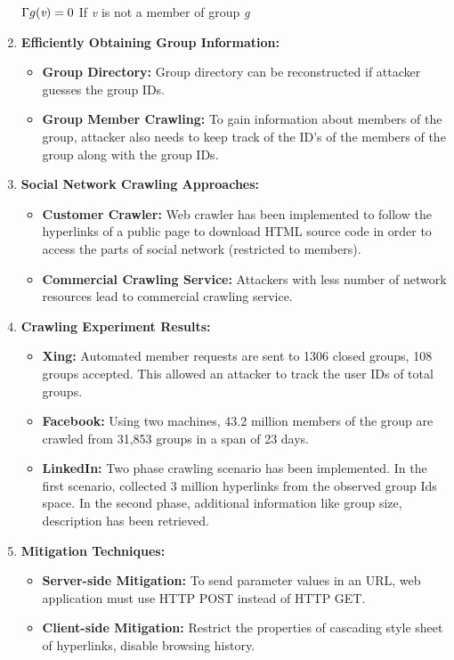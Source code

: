 \documentclass{article}
\begin{document}
\begin{enumerate}
$\Gamma g(\emph{v})=0$
If \emph{v} is not a member of group \emph{g}


\item\textbf{Efficiently Obtaining Group Information:}
\begin{itemize}
	\item \textbf{Group Directory:} Group directory can be reconstructed if attacker guesses the group IDs.
	\item \textbf{Group Member Crawling:} To gain information about members of the group, attacker also needs to keep track of the ID’s of the members of the group along with the group IDs.
\end{itemize}


\item\textbf{Social Network Crawling Approaches:}
\begin{itemize}
	\item \textbf{Customer Crawler:} Web crawler has been implemented to follow the hyperlinks of a public page to download HTML source code in order to access the parts of social network (restricted to members).
	\item \textbf{Commercial Crawling Service:} Attackers with less number of network resources lead to commercial crawling service.
\end{itemize}

\item\textbf{Crawling Experiment Results:}
\begin{itemize}
	\item \textbf{Xing:} Automated member requests are sent to 1306 closed groups, 108 groups accepted. This allowed an attacker to track the user IDs of total groups.	
	\item \textbf{Facebook:} Using two machines, 43.2 million members of the group are crawled from 31,853 groups in a span of 23 days.
	\item \textbf{LinkedIn:} Two phase crawling scenario has been implemented. In the first scenario, collected 3 million hyperlinks from the observed group Ids space. In the second phase, additional information like group size, description has been retrieved.
\end{itemize}


\item\textbf{Mitigation Techniques:}
\begin{itemize}
	\item \textbf{Server-side Mitigation:} To send parameter values in an URL, web application must use HTTP POST instead of HTTP GET.
	\item \textbf{Client-side Mitigation:} Restrict the properties of cascading style sheet of hyperlinks, disable browsing history.
\end{itemize}
\end{enumerate}
\end{document}
